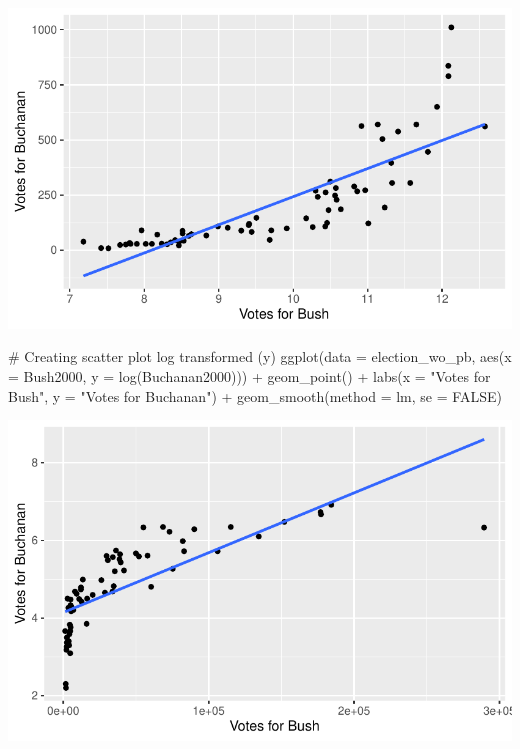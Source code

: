 \documentclass[
  letterpaper,
  DIV=11,
  numbers=noendperiod]{scrartcl}
\newenvironment{Shaded}{\begin{snugshade}}{\end{snugshade}}
\newcommand{\AttributeTok}[1]{\textcolor[rgb]{0.40,0.45,0.13}{#1}}
\newcommand{\CommentTok}[1]{\textcolor[rgb]{0.37,0.37,0.37}{#1}}
\newcommand{\ConstantTok}[1]{\textcolor[rgb]{0.56,0.35,0.01}{#1}}
\newcommand{\FunctionTok}[1]{\textcolor[rgb]{0.28,0.35,0.67}{#1}}
\newcommand{\NormalTok}[1]{\textcolor[rgb]{0.00,0.23,0.31}{#1}}
\newcommand{\SpecialCharTok}[1]{\textcolor[rgb]{0.37,0.37,0.37}{#1}}
\newcommand{\StringTok}[1]{\textcolor[rgb]{0.13,0.47,0.30}{#1}}
\begin{document}
\includegraphics{case-study-template_files/figure-pdf/unnamed-chunk-6-7.pdf}

\begin{Shaded}
\begin{Highlighting}[]
\CommentTok{\# Creating scatter plot log transformed (y)}
\FunctionTok{ggplot}\NormalTok{(}\AttributeTok{data =}\NormalTok{ election\_wo\_pb, }\FunctionTok{aes}\NormalTok{(}\AttributeTok{x =}\NormalTok{ Bush2000, }\AttributeTok{y =} \FunctionTok{log}\NormalTok{(Buchanan2000))) }\SpecialCharTok{+}
  \FunctionTok{geom\_point}\NormalTok{() }\SpecialCharTok{+}
  \FunctionTok{labs}\NormalTok{(}\AttributeTok{x =} \StringTok{"Votes for Bush"}\NormalTok{, }\AttributeTok{y =} \StringTok{"Votes for Buchanan"}\NormalTok{) }\SpecialCharTok{+}
  \FunctionTok{geom\_smooth}\NormalTok{(}\AttributeTok{method =}\NormalTok{ lm, }\AttributeTok{se =} \ConstantTok{FALSE}\NormalTok{)}
\end{Highlighting}
\end{Shaded}

\includegraphics{case-study-template_files/figure-pdf/unnamed-chunk-6-8.pdf}
\end{document}

